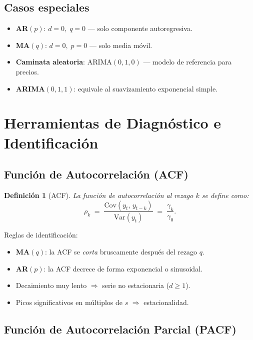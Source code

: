 \documentclass[12pt,a4paper]{article}
\newtheorem{definicion}{Definición}
\begin{document}
\subsection{Casos especiales}

\begin{itemize}
  \item \textbf{AR$(p)$}: $d=0,\;q=0$ — solo componente autoregresiva.
  \item \textbf{MA$(q)$}: $d=0,\;p=0$ — solo media móvil.
  \item \textbf{Caminata aleatoria}: ARIMA$(0,1,0)$ — modelo de referencia para precios.
  \item \textbf{ARIMA$(0,1,1)$}: equivale al suavizamiento exponencial simple.
\end{itemize}

\section{Herramientas de Diagnóstico e Identificación}

\subsection{Función de Autocorrelación (ACF)}

\begin{definicion}[ACF]
La \emph{función de autocorrelación} al rezago $k$ se define como:
\[
  \rho_k \;=\; \frac{\mathrm{Cov}(y_t,\,y_{t-k})}{\mathrm{Var}(y_t)}
           \;=\; \frac{\gamma_k}{\gamma_0}.
\]
\end{definicion}

Reglas de identificación:
\begin{itemize}
  \item \textbf{MA$(q)$}: la ACF se \emph{corta} bruscamente después del rezago $q$.
  \item \textbf{AR$(p)$}: la ACF decrece de forma exponencial o sinusoidal.
  \item Decaimiento muy lento $\Rightarrow$ serie no estacionaria ($d \geq 1$).
  \item Picos significativos en múltiplos de $s$ $\Rightarrow$ estacionalidad.
\end{itemize}

\subsection{Función de Autocorrelación Parcial (PACF)}
\end{document}

